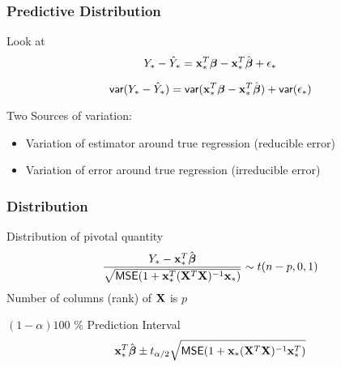 \documentclass[handout]{beamer}\usepackage[]{graphicx}\usepackage[]{color}
\begin{document}
\begin{frame}\frametitle{Predictive Distribution}
Look at
 $$Y_* -\hat{Y}_*  = \mathbf{x}_*^T \boldsymbol{\beta} - \mathbf{x}_*^T\hat{\boldsymbol{\beta}} + \epsilon_*$$ \pause

 $$\textsf{var}(Y_* -\hat{Y}_*)  = \textsf{var}(\mathbf{x}_*^{T} \boldsymbol{\beta} - \mathbf{x}_*^T\hat{\boldsymbol{\beta}}) +
 \textsf{var}(\epsilon_*)$$ \pause

\vfill
Two Sources of variation:
\begin{itemize}
\item Variation of estimator around true regression (reducible error) \pause
\item Variation of error around true regression (irreducible error)
\end{itemize}
\end{frame}
\begin{frame}\frametitle{Distribution}
Distribution of pivotal quantity
$$ \frac{Y_* - \mathbf{x}_*^T\hat{\boldsymbol{\beta}}}{
\sqrt{\textsf{MSE} (1 + \mathbf{x}_*^T(\mathbf{X}^T\mathbf{X})^{-1}\mathbf{x}_*)}} \sim t(n - p, 0, 1)
$$ \pause
Number of columns (rank) of $\mathbf{X}$ is $p$
\vfill

$(1 - \alpha) 100$ \% Prediction Interval
 $$\mathbf{x}_*^T \hat{\boldsymbol{\beta}} \pm  t_{\alpha/2} \sqrt{\textsf{MSE} (1 + \mathbf{x}_*(\mathbf{X}^T\mathbf{X})^{-1}\mathbf{x}_*^T)}$$
\end{frame}
\end{document}
